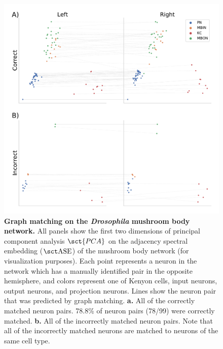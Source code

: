 \begin{figure}
    \centering
    \includegraphics[width = .8\linewidth]{figures/dnd/mb-matching.pdf}
    \caption{\textbf{Graph matching on the \textit{Drosophila} mushroom body network.} All panels show the first two dimensions of principal component analysis $\sct{PCA}$ on the adjacency spectral embedding ($\ase$) of the mushroom body network (for visualization purposes). Each point represents a neuron in the network which has a manually identified pair in the opposite hemisphere, and colors represent one of Kenyon cells, input neurons, output neurons, and projection neurons. 
    Lines show the neuron pair that was predicted by graph matching. 
    \textbf{a.} All of the correctly matched neuron pairs. 78.8\% of neuron pairs (78/99) were correctly matched. 
    \textbf{b.} All of the incorrectly matched neuron pairs. Note that all of the incorrectly matched neurons are matched to neurons of the same cell type.}
    \label{fig:mb-matching}
\end{figure}

